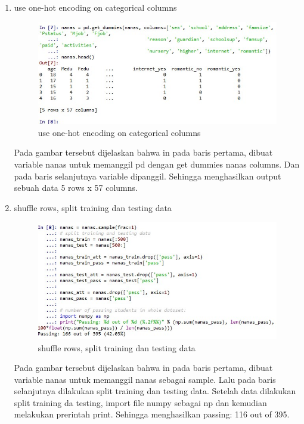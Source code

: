 \begin{enumerate}
\item  use one-hot encoding on categorical columns 
\begin{figure}
\centering
\includegraphics[scale=0.5]{figures/g3.jpg}
\caption{use one-hot encoding on categorical columns}
\label{contoh}
\end{figure}
\par Pada gambar tersebut dijelaskan bahwa in pada baris pertama, dibuat variable nanas untuk memanggil pd dengan get dummies nanas columns. Dan pada baris selanjutnya variable dipanggil. Sehingga menghasilkan output sebuah data 5 rows x 57 columns.

\item shuffle rows,  split training dan testing data 
\begin{figure}
\centering
\includegraphics[scale=0.5]{figures/g4.jpg}
\caption{shuffle rows, split training dan testing data}
\label{contoh}
\end{figure}
\par Pada gambar tersebut dijelaskan bahwa in pada baris pertama, dibuat variable nanas untuk memanggil nanas sebagai sample. Lalu pada baris selanjutnya dilakukan split training dan testing data. Setelah data dilakukan split training da testing, import file numpy sebagai np dan kemudian melakukan prerintah print. Sehingga menghasilkan passing: 116 out of 395.


\end{enumerate}
